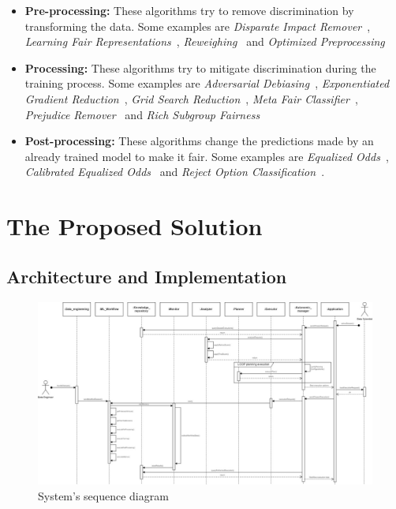 \documentclass[10pt,conference]{IEEEtran}
\begin{document}
\begin{itemize}
\item \textbf{Pre-processing:} These algorithms try to remove discrimination by transforming the data. Some examples are \textit{Disparate Impact Remover}~\citep{Feldman_2015}, \textit{Learning Fair Representations}~\citep{Zemel_2013}, \textit{Reweighing}~\citep{Kamiran_2011} and \textit{Optimized Preprocessing}~\citep{Calmon_2017}
\item \textbf{Processing:} These algorithms try to mitigate discrimination during the training process. Some examples are \textit{Adversarial Debiasing}~\citep{Zhang_2018}, \textit{Exponentiated Gradient Reduction}~\citep{Agarwal_2018}, \textit{Grid Search Reduction}~\citep{Agarwal_2019}, \textit{Meta Fair Classifier}~\citep{Celis_2019}, \textit{Prejudice Remover}~\citep{Kamishima_2012} and \textit{Rich Subgroup Fairness}~\citep{Kearns_2018}
\item \textbf{Post-processing:} These algorithms change the predictions made by an already trained model to make it fair. Some examples are \textit{Equalized Odds}~\citep{Hardt_2016}, \textit{Calibrated Equalized Odds}~\citep{Pleiss_2017} and \textit{Reject Option Classification}~\citep{Kamiran_2012}.
\end{itemize}

\section{The Proposed Solution}

\subsection{Architecture and Implementation}

\begin{figure}
\clearpage
\includegraphics[scale=0.465]{images/Diagrama_Sequencia-eng.jpg}
\caption {System's sequence diagram}
\label{fig:DiagramaSequencia}
\end{figure}
\end{document}
